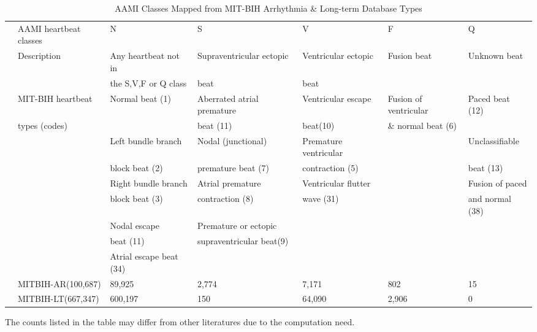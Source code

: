 \documentclass[journal]{IEEEtran}
\begin{document}
\begin{table}[!htbp]
\begin{center}
\begin{threeparttable}
\caption{AAMI Classes Mapped from MIT-BIH Arrhythmia \& Long-term Database Types}
\label{Table1}
\begin{tabular}{cllllll}
\hline
& AAMI heartbeat classes & N & S & V & F & Q \\
& Description  &Any heartbeat not in & Supraventricular ectopic  & Ventricular ectopic  & Fusion beat & Unknown beat \\
&                     &the S,V,F or Q class & beat   		     & beat	      &	     &          \\
\hline
& MIT-BIH heartbeat  &Normal beat (1)            & Aberrated atrial premature & Ventricular escape & Fusion of ventricular& Paced beat (12)\\
&  types (codes)   &  					  &  beat (11)		    &  beat(10)	            & \& normal beat (6)		      &             \\

&                     &Left bundle branch   &  Nodal (junctional) &Premature ventricular& 	 &  Unclassifiable \\
&                     &block beat (2)            & premature beat (7)    &contraction (5)         &	   & beat (13)   \\

&                     & Right bundle branch & Atrial premature & Ventricular flutter &    &  Fusion of paced  \\
&                     & block beat (3) & contraction (8)     & wave (31) & 	   & and normal (38)  \\

&                     & Nodal escape  & Premature or ectopic & 	     &  &                          \\
&                     & beat (11)	  & supraventricular beat(9) &     &   &     \\

&                     & Atrial escape beat (34)   &  	  				      & 				            & 			      &                          \\
\hline
& MITBIH-AR(100,687) & 89,925    & 2,774   & 7,171   & 802    & 15        \\
& MITBIH-LT(667,347) & 600,197  &  150  & 64,090  & 	2,906   & 0       \\

\hline
\end{tabular}
\begin{tablenotes}
\item The counts listed in the table may differ from other literatures \cite{chaza} due to the computation need.
\end{tablenotes}
\end{threeparttable}

\end{center}
     \end{table}
\end{document}
